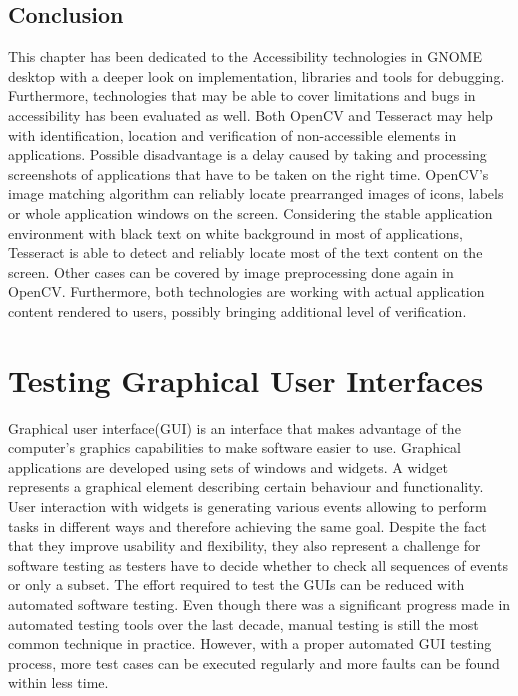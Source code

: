 \section{Conclusion}
This chapter has been dedicated to the Accessibility technologies in GNOME desktop with a deeper look on implementation, libraries and tools for debugging. Furthermore, technologies that may be able to cover limitations and bugs in accessibility has been evaluated as well. Both OpenCV and Tesseract may help with identification, location and verification of non-accessible elements in applications. Possible disadvantage is a delay caused by taking and processing screenshots of applications that have to be taken on the right time. OpenCV's image matching algorithm can reliably locate prearranged images of icons, labels or whole application windows on the screen. Considering the stable application environment with black text on white background in most of applications, Tesseract is able to detect and reliably locate most of the text content on the screen. Other cases can be covered by image preprocessing done again in OpenCV. Furthermore, both technologies are working with actual application content rendered to users, possibly bringing additional level of verification.

\chapter{Testing Graphical User Interfaces}
Graphical user interface(GUI) is an interface that makes advantage of the computer's graphics capabilities to make software easier to use.\cite{guidefinition} Graphical applications are developed using sets of windows and widgets. A widget represents a graphical element describing certain behaviour and functionality. User interaction with widgets is generating various events allowing to perform tasks in different ways and therefore achieving the same goal. Despite the fact that they improve usability and flexibility, they also represent a challenge for software testing as testers have to decide whether to check all sequences of events or only a subset. The effort required to test the GUIs can be reduced with automated software testing. Even though there was a significant progress made in automated testing tools over the last decade, manual testing is still the most common technique in practice. However, with a proper automated GUI testing process, more test cases can be executed regularly and more faults can be found within less time.\cite{patternbasedtesting}

